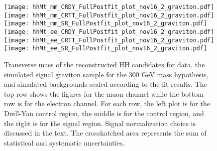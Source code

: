 \begin{figure}[tbp]
  \begin{center}
    \texttt{[image: hhMt\_mm\_CRDY\_FullPostfit\_plot\_nov16\_2\_graviton.pdf]}
    \texttt{[image: hhMt\_mm\_CRTT\_FullPostfit\_plot\_nov16\_2\_graviton.pdf]}
    \texttt{[image: hhMt\_mm\_SR\_FullPostfit\_plot\_nov16\_2\_graviton.pdf]} \\
    \texttt{[image: hhMt\_ee\_CRDY\_FullPostfit\_plot\_nov16\_2\_graviton.pdf]}
    \texttt{[image: hhMt\_ee\_CRTT\_FullPostfit\_plot\_nov16\_2\_graviton.pdf]}
    \texttt{[image: hhMt\_ee\_SR\_FullPostfit\_plot\_nov16\_2\_graviton.pdf]}
    \caption{Transverse mass of the reconstructed HH candidates for data, the simulated signal graviton sample
    for the 300 GeV mass hypothesis, and simulated backgrounds scaled according to the fit results. The top
    row shows the figures for the muon channel while the bottom row is for the electron channel. For each row,
    the left plot is for the Drell-Yan control region, the middle is for the \ttbar control region, and the right
    is for the signal region. Signal normalization choice is discussed in the text. The crosshatched area represents
    the sum of statistical and systematic uncertainties.}
    \label{fig:MCcomparisons}
%                                                                                                                 
  \end{center}
\end{figure}




